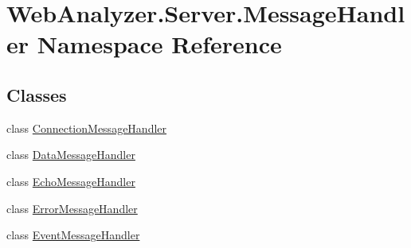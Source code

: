 \hypertarget{namespace_web_analyzer_1_1_server_1_1_message_handler}{}\section{Web\+Analyzer.\+Server.\+Message\+Handler Namespace Reference}
\label{namespace_web_analyzer_1_1_server_1_1_message_handler}
\subsection*{Classes}
\begin{DoxyCompactItemize}
\item 
class \hyperlink{class_web_analyzer_1_1_server_1_1_message_handler_1_1_connection_message_handler}{Connection\+Message\+Handler}
\item 
class \hyperlink{class_web_analyzer_1_1_server_1_1_message_handler_1_1_data_message_handler}{Data\+Message\+Handler}
\item 
class \hyperlink{class_web_analyzer_1_1_server_1_1_message_handler_1_1_echo_message_handler}{Echo\+Message\+Handler}
\item 
class \hyperlink{class_web_analyzer_1_1_server_1_1_message_handler_1_1_error_message_handler}{Error\+Message\+Handler}
\item 
class \hyperlink{class_web_analyzer_1_1_server_1_1_message_handler_1_1_event_message_handler}{Event\+Message\+Handler}
\end{DoxyCompactItemize}
